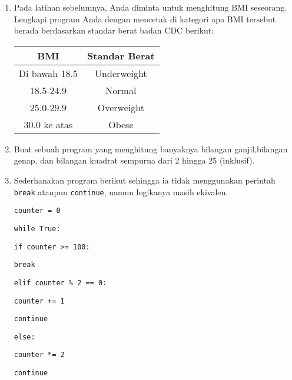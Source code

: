 \documentclass[14pt]{extarticle}
\begin{document}
\begin{enumerate}
	\item Pada latihan sebelumnya, Anda diminta untuk menghitung BMI seseorang. Lengkapi program Anda dengan mencetak di kategori apa BMI tersebut berada berdasarkan standar berat badan CDC berikut:
	\begin{center}
		\begin{tabular}{|c|c|} \hline
		BMI & Standar Berat \\ \hline
		Di bawah 18.5 & Underweight \\ \hline
		18.5-24.9 & Normal \\ \hline
		25.0-29.9 & Overweight \\ \hline
		30.0 ke atas & Obese \\ \hline
		\end{tabular}
	\end{center}
	\item Buat sebuah program yang menghitung banyaknya bilangan ganjil,bilangan genap, dan bilangan kuadrat sempurna dari 2 hingga 25 (inklusif).
	\item Sederhanakan program berikut sehingga ia  tidak menggunakan perintah \texttt{break} ataupun \texttt{continue}, namun logikanya masih ekivalen.
	

	\texttt{counter = 0}
	
	\texttt{while True:}
	
	\quad \quad \texttt{if counter >= 100:}
	
	\quad \quad \quad \quad \texttt{break}
	
	\quad \quad \texttt{elif counter \% 2 == 0:}
	
	\quad \quad \quad \texttt{counter += 1}
	
	\quad \quad \quad \quad \texttt{continue}
	
	\quad \quad \texttt{else:}
	
	\quad \quad \quad \quad \texttt{counter *= 2}
	
	\quad \quad \quad \quad \texttt{continue}
	

\end{enumerate}
\end{document}
